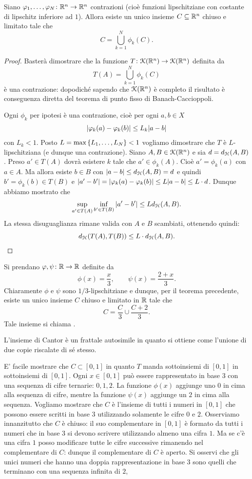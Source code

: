 \begin{theorem}
Siano $\varphi_1, \dots, \varphi_N \colon \mathbb R^n \to \mathbb R^n$ contrazioni (cioè funzioni lipschitziane con costante di lipschitz inferiore ad $1$).
Allora
esiste un unico insieme $C\subseteq \mathbb R^n$ chiuso e limitato tale che
\[
  C = \bigcup_{k=1}^N \phi_k(C).
\]
\end{theorem}
%
\begin{proof}
Basterà dimostrare che la funzione $T\colon \mathcal K(\mathbb R^n)\to \mathcal K(\mathbb R^n)$ definita da
\[
  T(A) = \bigcup_{k=1}^N \phi_k(C)
\]
è una contrazione: dopodiché sapendo che $\mathcal K(\mathbb R^n)$ è completo il risultato è conseguenza diretta del teorema di punto fisso di Banach-Caccioppoli.

Ogni $\phi_k$ per ipotesi è una contrazione, cioè
per ogni $a,b\in X$
\[
  {\left|\varphi_k(a)-\varphi_k(b)\right|} \le L_k {\left|a-b\right|}
\]
con $L_k< 1$. Posto $L=\max {\left\{ L_1, \dots, L_N \right\}} < 1$ vogliamo dimostrare che $T$ è $L$-lipschitziana (e dunque una contrazione). Siano $A,B \in \mathcal K(\mathbb R^n)$ e sia $d = d_\mathcal H(A,B)$. Preso $a' \in T(A)$ dovrà esistere $k$ tale che $a' \in \phi_k(A)$. Cioè $a'= \phi_k(a)$ con $a\in A$. Ma allora esiste $b\in B$ con ${\left|a-b\right|}\le d_\mathcal H(A,B) = d$ e quindi $b'=\phi_k(b) \in T(B)$ e ${\left|a'-b'\right|} = {\left|\varphi_k(a)-\varphi_k(b)\right|} \le L {\left|a-b\right|} \le L \cdot d$. Dunque abbiamo mostrato che
\[
  \sup_{a' \in T(A)} \inf_{b'\in T(B)} {\left|a'-b'\right|} \le L d_\mathcal H(A,B).
\]
La stessa disuguaglianza rimane valida con $A$ e $B$ scambiati, ottenendo quindi:
\[
  d_\mathcal H(T(A),T(B)) \le L\cdot d_\mathcal H(A,B).
\]
\end{proof}

\begin{example}
Si prendano $\varphi, \psi\colon \mathbb R \to \mathbb R$ definite da
\[
  \phi(x) = \frac{x}{3}, \qquad
  \psi(x) = \frac{2+x}{3}.
\]
Chiaramente $\phi$ e $\psi$ sono $1/3$-lipschitziane e dunque, per il teorema precedente, esiste un unico insieme $C$ chiuso e limitato in $\mathbb R$ tale che
\[
  C = \frac{C}{3} \cup \frac{C+2}{3}.
\]
Tale insieme si chiama .

L'insieme di Cantor è un frattale autosimile in quanto si ottiene come l'unione di due copie riscalate di sé stesso.

E' facile mostrare che $C\subset [0,1]$ in quanto $T$ manda sottoinsiemi di $[0,1]$ in sottoinsiemi di $[0,1]$.
Ogni $x\in [0,1]$ può essere rappresentato in base $3$ con una sequenza di cifre ternarie: $0,1,2$. La funzione $\phi(x)$ aggiunge uno $0$ in cima alla sequenza di cifre, mentre la funzione $\psi(x)$ aggiunge un $2$ in cima alla sequenza.
Vogliamo mostrare che $C$ è l'insieme di tutti i numeri in $[0,1]$ che possono essere scritti in base $3$ utilizzando solamente le cifre $0$ e $2$. Osserviamo innanzitutto che $C$ è chiuso: il suo complementare in $[0,1]$ è formato da tutti i numeri che in base $3$ si devono scrivere utilizzando almeno una cifra $1$. Ma se c'è una cifra $1$ posso modificare tutte le cifre successive rimanendo nel complementare di $C$: dunque il complementare di $C$ è aperto. Si osservi che gli unici numeri che hanno una doppia rappresentazione in base $3$ sono quelli che terminano con una sequenza infinita di $2$,
\end{example}

